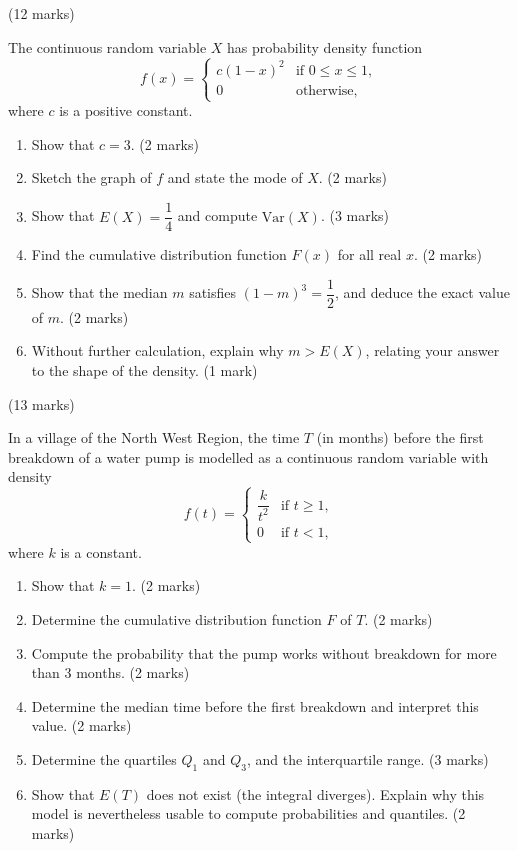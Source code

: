 \documentclass[11pt]{article}
\begin{document}
\begin{exercice} \hfill (12 marks)

The continuous random variable $X$ has probability density function
\[
f(x) = \begin{cases} c(1 - x)^2 & \text{if } 0 \leq x \leq 1, \\ 0 & \text{otherwise,} \end{cases}
\]
where $c$ is a positive constant.
\begin{enumerate}
\item Show that $c = 3$. \hfill (2 marks)
\item Sketch the graph of $f$ and state the mode of $X$. \hfill (2 marks)
\item Show that $E(X) = \dfrac{1}{4}$ and compute $\mathrm{Var}(X)$. \hfill (3 marks)
\item Find the cumulative distribution function $F(x)$ for all real $x$. \hfill (2 marks)
\item Show that the median $m$ satisfies $(1 - m)^3 = \dfrac{1}{2}$, and deduce the exact value of $m$. \hfill (2 marks)
\item Without further calculation, explain why $m > E(X)$, relating your answer to the shape of the density. \hfill (1 mark)
\end{enumerate}
\end{exercice}

\begin{exercice} \hfill (13 marks)

In a village of the North West Region, the time $T$ (in months) before the first breakdown of a water pump is modelled as a continuous random variable with density
\[
f(t) = \begin{cases} \dfrac{k}{t^2} & \text{if } t \geq 1, \\[4pt] 0 & \text{if } t < 1, \end{cases}
\]
where $k$ is a constant.
\begin{enumerate}
\item Show that $k = 1$. \hfill (2 marks)
\item Determine the cumulative distribution function $F$ of $T$. \hfill (2 marks)
\item Compute the probability that the pump works without breakdown for more than $3$ months. \hfill (2 marks)
\item Determine the median time before the first breakdown and interpret this value. \hfill (2 marks)
\item Determine the quartiles $Q_1$ and $Q_3$, and the interquartile range. \hfill (3 marks)
\item Show that $E(T)$ does not exist (the integral diverges). Explain why this model is nevertheless usable to compute probabilities and quantiles. \hfill (2 marks)
\end{enumerate}
\end{exercice}
\end{document}
